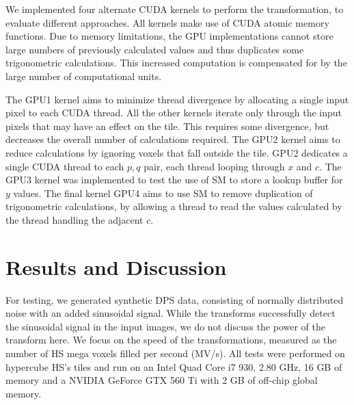 We implemented four alternate CUDA kernels to perform the transformation, to evaluate different approaches.
All kernels make use of CUDA atomic memory functions.
Due to memory limitations, the GPU implementations cannot store large numbers of previously calculated values and thus duplicates some trigonometric calculations.
This increased computation is compensated for by the large number of computational units.

The GPU1 kernel aims to minimize thread divergence by allocating a single input pixel to each CUDA thread.
All the  other kernels iterate only through the input pixels that may have an effect on the tile.
This requires some divergence, but decreases the overall number of calculations required.
The GPU2 kernel aims to reduce calculations by ignoring voxels that fall outside the tile.
GPU2 dedicates a single CUDA thread to each $p,q$ pair, each thread looping through $x$ and $c$.
The GPU3 kernel was implemented to test the use of SM to store a lookup buffer for $y$ values.
The final kernel GPU4 aims to use SM to remove duplication of trigonometric calculations, by allowing a thread to read the values calculated by the thread handling the adjacent $c$.

\section{Results and Discussion}
\label{eval}

For testing, we generated synthetic DPS data, consisting of normally distributed noise with an added sinusoidal signal.
While the transforms successfully detect the sinusoidal signal in the input images, we do not discuss the power of the transform here.
We focus on the speed of the transformations, measured as the number of HS mega voxels filled per second (MV/s).  
All tests were performed on hypercube HS's tiles and run on an Intel Quad Core i7 930, 2.80 GHz, 16 GB of memory and a NVIDIA GeForce GTX 560 Ti with 2 GB of off-chip global memory.

